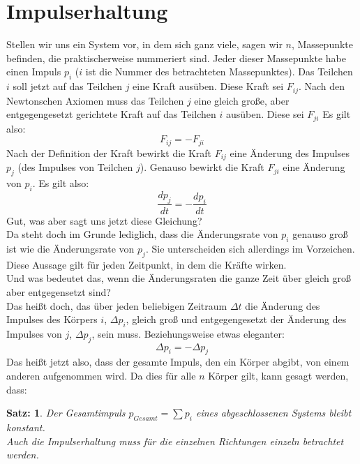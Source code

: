 \documentclass[a4paper, twocolumn, 9pt]{article}
\newtheorem*{satz}{Satz:}
\begin{document}
\section*{Impulserhaltung}
Stellen wir uns ein System vor, in dem sich ganz viele, sagen wir $n$, Massepunkte befinden, die praktischerweise nummeriert sind. Jeder dieser Massepunkte habe einen Impuls $p_i$ ($i$ ist die Nummer des betrachteten Massepunktes). Das Teilchen $i$ soll jetzt auf das Teilchen $j$ eine Kraft ausüben. Diese Kraft sei $F_{ij}$. Nach den Newtonschen Axiomen muss das Teilchen $j$ eine gleich große, aber entgegengesetzt gerichtete Kraft auf das Teilchen $i$ ausüben. Diese sei $F_{ji}$ Es gilt also:
\begin{equation*}
F_{ij}=-F_{ji}    
\end{equation*}
Nach der Definition der Kraft bewirkt die Kraft $F_{ij}$ eine Änderung des Impulses $p_j$ (des Impulses von Teilchen $j$). Genauso bewirkt die Kraft $F_{ji}$ eine Änderung von $p_i$. Es gilt also:
\begin{equation*}
\frac{dp_j}{dt}=-\frac{dp_i}{dt}    
\end{equation*}
Gut, was aber sagt uns jetzt diese Gleichung?\\
Da steht doch im Grunde lediglich, dass die Änderungsrate von $p_i$ genauso groß ist wie die Änderungsrate von $p_j$. Sie unterscheiden sich allerdings im Vorzeichen. Diese Aussage gilt für jeden Zeitpunkt, in dem die Kräfte wirken. \\
Und was bedeutet das, wenn die Änderungsraten die ganze Zeit über gleich groß aber entgegensetzt sind? \\
Das heißt doch, das über jeden beliebigen Zeitraum $\Delta t$ die Änderung des Impulses des Körpers $i$, $\Delta p_i$, gleich groß und entgegengesetzt der Änderung des Impulses von $j$, $\Delta p_j$, sein muss. Beziehungsweise etwas eleganter:
\begin{equation*}
    \Delta p_i = -\Delta p_j
\end{equation*}
Das heißt jetzt also, dass der gesamte Impuls, den ein Körper abgibt, von einem anderen aufgenommen wird. Da dies für alle $n$ Körper gilt, kann gesagt werden, dass:
\begin{satz}
Der Gesamtimpuls $p_{Gesamt} = \sum p_i$ eines abgeschlossenen Systems bleibt konstant. \\ Auch die Impulserhaltung muss für die einzelnen Richtungen einzeln betrachtet werden. 
\end{satz}
\end{document}
